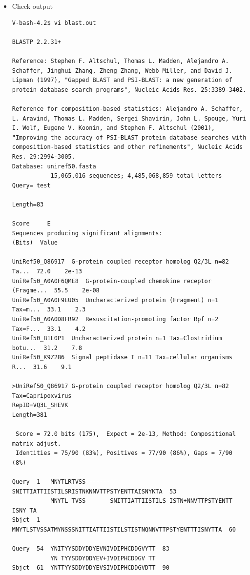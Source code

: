 \documentclass{article}
\begin{document}
\begin{itemize}
\begin{verbatim}
\end{verbatim}
\normalsize
\item Check output
\tiny\begin{verbatim}
V-bash-4.2$ vi blast.out

BLASTP 2.2.31+

Reference: Stephen F. Altschul, Thomas L. Madden, Alejandro A.
Schaffer, Jinghui Zhang, Zheng Zhang, Webb Miller, and David J.
Lipman (1997), "Gapped BLAST and PSI-BLAST: a new generation of
protein database search programs", Nucleic Acids Res. 25:3389-3402.

Reference for composition-based statistics: Alejandro A. Schaffer,
L. Aravind, Thomas L. Madden, Sergei Shavirin, John L. Spouge, Yuri
I. Wolf, Eugene V. Koonin, and Stephen F. Altschul (2001),
"Improving the accuracy of PSI-BLAST protein database searches with
composition-based statistics and other refinements", Nucleic Acids
Res. 29:2994-3005.
Database: uniref50.fasta
           15,065,016 sequences; 4,485,068,859 total letters
Query= test

Length=83
                                                                      Score     E
Sequences producing significant alignments:                          (Bits)  Value

UniRef50_Q86917  G-protein coupled receptor homolog Q2/3L n=82 Ta...  72.0    2e-13
UniRef50_A0A0F6QME8  G-protein-coupled chemokine receptor (Fragme...  55.5    2e-08
UniRef50_A0A0F9EU05  Uncharacterized protein (Fragment) n=1 Tax=m...  33.1    2.3
UniRef50_A0A0D8FR92  Resuscitation-promoting factor Rpf n=2 Tax=F...  33.1    4.2
UniRef50_B1L0P1  Uncharacterized protein n=1 Tax=Clostridium botu...  31.2    7.8
UniRef50_K9Z2B6  Signal peptidase I n=11 Tax=cellular organisms R...  31.6    9.1

>UniRef50_Q86917 G-protein coupled receptor homolog Q2/3L n=82 Tax=Capripoxvirus
RepID=VQ3L_SHEVK
Length=381

 Score = 72.0 bits (175),  Expect = 2e-13, Method: Compositional matrix adjust.
 Identities = 75/90 (83%), Positives = 77/90 (86%), Gaps = 7/90 (8%)

Query  1   MNYTLRTVSS-------SNITTIATTIISTILSRISTNKNNVTTPSTYENTTAISNYKTA  53
           MNYTL TVSS       SNITTIATTIISTILS ISTN+NNVTTPSTYENTT ISNY TA
Sbjct  1   MNYTLSTVSSATMYNSSSNITTIATTIISTILSTISTNQNNVTTPSTYENTTTISNYTTA  60

Query  54  YNITYYSDDYDDYEVNIVDIPHCDDGVYTT  83
           YN TYYSDDYDDYEV+IVDIPHCDDGV TT
Sbjct  61  YNTTYYSDDYDDYEVSIVDIPHCDDGVDTT  90


\end{verbatim}
\end{itemize}
\end{document}

